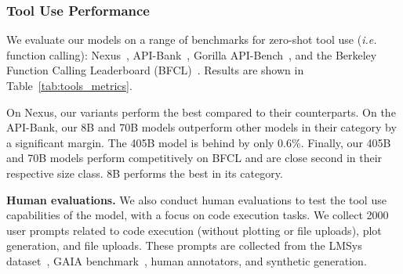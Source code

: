 \documentclass[dvipsnames]{fairmeta}
\begin{document}
\subsubsection{Tool Use Performance}
\label{subsubsec:tool_use_evals}

We evaluate our models on a range of benchmarks for zero-shot tool use (\emph{i.e.} function calling): Nexus~\citep{srinivasan2023nexusraven}, API-Bank~\citep{li2023api}, Gorilla API-Bench~\citep{patil2023gorilla}, and the Berkeley Function Calling Leaderboard (BFCL)~\citep{berkeley-function-calling-leaderboard}. Results are shown in Table~\ref{tab:tools_metrics}.

On Nexus, our \llamathree variants perform the best compared to their counterparts. On the API-Bank, our \llamathree 8B and 70B models outperform other models in their category by a significant margin. The 405B model is behind \sonnet by only 0.6\%. Finally, our 405B and 70B models perform competitively on BFCL and are close second in their respective size class. \llamathree 8B performs the best in its category.

\textbf{Human evaluations.}
We also conduct human evaluations to test the tool use capabilities of the model, with a focus on code execution tasks. We collect 2000 user prompts related to code execution (without plotting or file uploads), plot generation, and file uploads. These prompts are collected from the LMSys dataset~\citep{chiang2024chatbot}, GAIA benchmark~\citep{mialon2023gaia}, human annotators, and synthetic generation.
\end{document}
